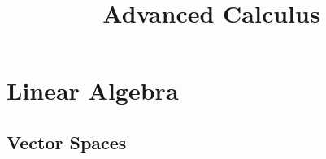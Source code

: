 \documentclass[]{article}
\title{Advanced Calculus}
\author{}
\date{}
\theoremstyle{definition}
\begin{document}
\maketitle


\section{Linear Algebra}
\subsection{Vector Spaces}
\end{document}
